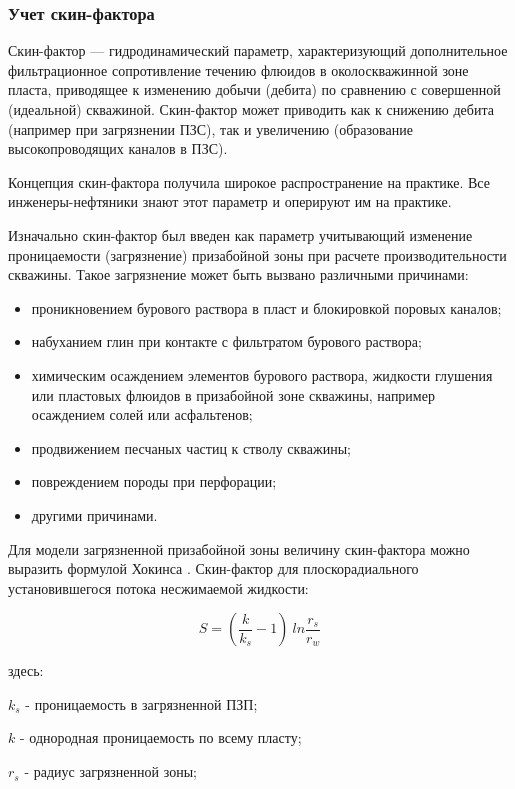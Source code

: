 \subsubsection{Учет скин-фактора}

Скин-фактор — гидродинамический параметр, характеризующий дополнительное фильтрационное сопротивление течению флюидов в околоскважинной зоне пласта, приводящее к изменению добычи (дебита) по сравнению с совершенной (идеальной) скважиной. Скин-фактор может приводить как к снижению дебита (например при загрязнении ПЗС), так и увеличению (образование высокопроводящих каналов в ПЗС).

Концепция скин-фактора получила широкое распространение на практике. Все инженеры-нефтяники знают этот параметр и оперируют им на практике. 

Изначально скин-фактор был введен как параметр учитывающий изменение проницаемости (загрязнение) призабойной зоны при расчете производительности скважины. Такое загрязнение может быть вызвано различными причинами:
\begin{itemize}
	\item проникновением бурового раствора в пласт и блокировкой поровых каналов;
	\item набуханием глин при контакте с фильтратом бурового раствора;
	\item химическим осаждением элементов бурового раствора, жидкости глушения или пластовых флюидов в призабойной зоне скважины, например осаждением солей или асфальтенов;
	\item продвижением песчаных частиц к стволу скважины;
	\item повреждением породы при перфорации;
	\item другими причинами.
\end{itemize}	

Для модели загрязненной призабойной зоны величину скин-фактора можно выразить формулой Хокинса \cite{Hawkins_1956}. Скин-фактор для плоскорадиального установившегося потока несжимаемой жидкости:

\begin{equation} \label{eq:skin_hokins}
S =\left( \frac{k}{k_s} -1\right)\ ln\frac{r_s}{r_w}
\end{equation}

здесь:

$k_s$ - проницаемость в загрязненной ПЗП;

$k$ - однородная проницаемость по всему пласту;

$r_s$ - радиус загрязненной зоны;

